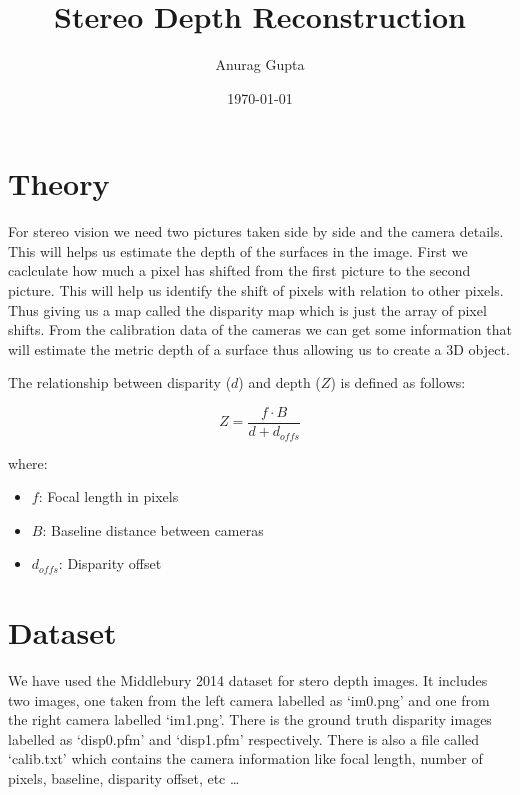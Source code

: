 \documentclass{article}
\title{Stereo Depth Reconstruction}
\author{Anurag Gupta}
\date{\today}
\begin{document}
\maketitle

\vspace{1cm}

\section{Theory}

\medskip
For stereo vision we need two pictures taken side by side and the camera details. This will helps us estimate the depth of the surfaces in the image.
First we caclculate how much a pixel has shifted from the first picture to the second picture. This will help us identify the shift of pixels 
with relation to other pixels. Thus giving us a map called the disparity map which is just the array of pixel shifts. From the calibration data of 
the cameras we can get some information that will estimate the metric depth of a surface thus allowing us to create a 3D object.

The  relationship between disparity ($d$) and depth ($Z$) is defined as follows:

\begin{equation}
Z = \frac{f \cdot B}{d + d_{offs}}
\end{equation}

where:
\begin{itemize}
    \item $f$: Focal length in pixels 
    \item $B$: Baseline distance between cameras 
    \item $d_{offs}$: Disparity offset 
\end{itemize}

\vspace{1cm}

\section{Dataset}
\bigskip
We have used the Middlebury 2014 dataset for stero depth images. It includes two images, one taken from the left camera labelled as `im0.png' and one from the right camera labelled
`im1.png'. There is the ground truth disparity images labelled as `disp0.pfm' and `disp1.pfm' respectively. There is also a file called `calib.txt' which contains the camera information
like focal length, number of pixels, baseline, disparity offset, etc \ldots
\end{document}
